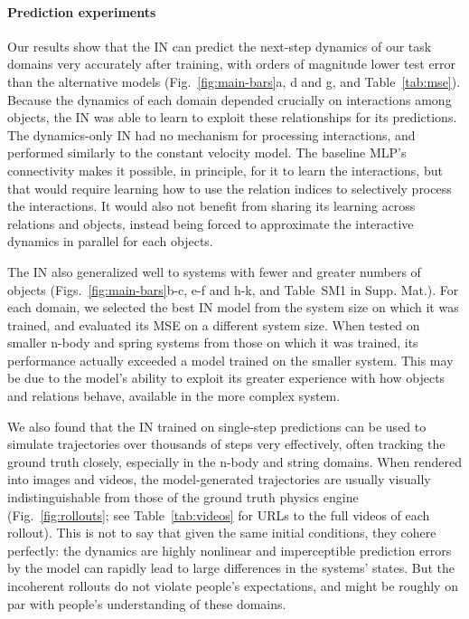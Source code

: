 \documentclass{article}
\begin{document}
\paragraph{Prediction experiments}
Our results show that the IN can predict the next-step dynamics of our
task domains very accurately after training, with orders of magnitude
lower test error than the alternative models
(Fig.~\ref{fig:main-bars}a, d and g, and Table~\ref{tab:mse}). Because
the dynamics of each domain depended crucially on interactions among
objects, the IN was able to learn to exploit these relationships for
its predictions. The dynamics-only IN had no mechanism for processing
interactions, and performed similarly to the constant velocity
model. The baseline MLP's connectivity makes it possible, in
principle, for it to learn the interactions, but that would require
learning how to use the relation indices to selectively process the
interactions. It would also not benefit from sharing its learning
across relations and objects, instead being forced to approximate the
interactive dynamics in parallel for each objects.

The IN also generalized well to systems with fewer and greater numbers
of objects (Figs.~\ref{fig:main-bars}b-c, e-f and h-k, and Table~SM1
in Supp. Mat.). For each domain, we selected the best IN model from
the system size on which it was trained, and evaluated its MSE on a
different system size. When tested on smaller n-body and spring
systems from those on which it was trained, its performance actually
exceeded a model trained on the smaller system. This may be due to the
model's ability to exploit its greater experience with how objects and
relations behave, available in the more complex system.

We also found that the IN trained on single-step predictions can be
used to simulate trajectories over thousands of steps very
effectively, often tracking the ground truth closely, especially in
the n-body and string domains. When rendered into images and videos,
the model-generated trajectories are usually visually
indistinguishable from those of the ground truth physics engine
(Fig.~\ref{fig:rollouts}; see Table~\ref{tab:videos} for URLs to the
full videos of each rollout). This is not to say that given the same
initial conditions, they cohere perfectly: the dynamics are highly
nonlinear and imperceptible prediction errors by the model can rapidly
lead to large differences in the systems' states. But the incoherent
rollouts do not violate people's expectations, and might be roughly on
par with people's understanding of these domains.
\end{document}
